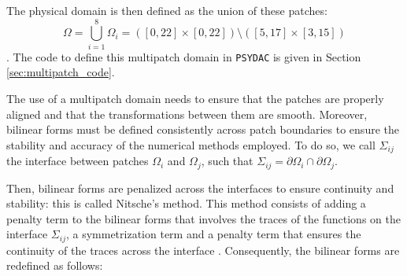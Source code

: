 \documentclass[a4paper,12pt,twoside]{report}
\begin{document}
The physical domain is then defined as the union of these patches: $$\Omega = \bigcup_{i=1}^8 \Omega_i = ([0,22] \times [0,22]) \setminus ([5,17] \times [3,15])$$.
The code to define this multipatch domain in \texttt{PSYDAC} is given in Section \ref{sec:multipatch_code}.

The use of a multipatch domain needs to ensure that the patches are properly aligned and that the transformations between them are smooth. Moreover, bilinear forms must be defined consistently across patch boundaries to ensure the stability and accuracy of the numerical methods employed. 
To do so, we call $\Sigma_{ij}$ the interface between patches $\Omega_i$ and $\Omega_j$, such that $\Sigma_{ij} = \partial \Omega_i \cap \partial \Omega_j$.

Then, bilinear forms are penalized across the interfaces to ensure continuity and stability: this is called Nitsche's method. 
This method consists of adding a penalty term to the bilinear forms that involves the traces of the functions on the interface $\Sigma_{ij}$, a symmetrization term and a penalty term that ensures the continuity of the traces across the interface \cite{fritz_comparison_2004} \cite{Hansbo2003}.
Consequently, the bilinear forms are redefined as follows:
\end{document}
